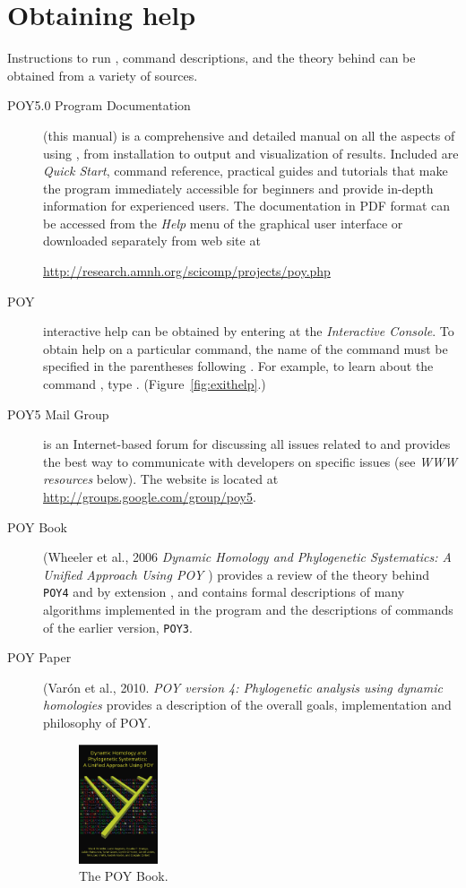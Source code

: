 {\section{Obtaining help} \label{sec:help}
Instructions to run \poy, command descriptions, and the theory behind \poy can be obtained from a variety of sources.
\begin{description}
\item[POY5.0 Program Documentation] (this manual) is a comprehensive and detailed manual on all the aspects of 
using \poy, from installation to output and visualization of results. Included are \emph{Quick Start}, \poy command 
reference, practical guides and tutorials that make the program immediately accessible for beginners and provide 
in-depth information for experienced users. The documentation in PDF format can be accessed from the \emph{Help} 
menu of the graphical user interface or downloaded separately from \poy web site at
\begin{center}
\url{http://research.amnh.org/scicomp/projects/poy.php}
\end{center}
\item[POY] interactive help can be obtained by entering  at the \poy \emph{Interactive Console}. 
To obtain help on a particular command, the name of the command must be specified in the parentheses following 
. For example, to learn about the command , type . 
(Figure~\ref{fig:exithelp}.)
\item[POY5 Mail Group] is an Internet-based forum for discussing all issues related to \poy and provides the best way to 
communicate with \poy developers on specific issues (see \emph{WWW resources} below). The website is 
located at \url{http://groups.google.com/group/poy5}. 
\item[POY Book] (Wheeler et al., 2006 \emph{Dynamic Homology and Phylogenetic Systematics: A Unified 
Approach Using POY \cite{wheeleretal2006}}) provides a review of the theory behind \texttt{POY4} and by extension \poy, and contains 
formal descriptions of many algorithms implemented in the program and the descriptions of commands of the earlier version, \texttt{POY3}.
\item[POY Paper] (Var\'on et al., 2010. \emph{POY version 4: Phylogenetic analysis using dynamic homologies \cite{Varonetal2010}} 
provides a description of the overall goals, implementation and philosophy of POY.

\begin{figure}[htbp]
   \centering
   \includegraphics[width=0.23\textwidth]{doc/figures/figpoybook.jpg}
   \caption{The POY Book.}
   \label{fig:figprocess}
\end{figure}
\end{description}

}
